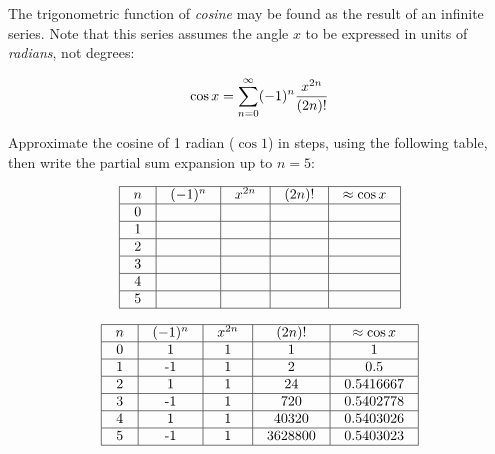 

The trigonometric function of {\it cosine} may be found as the result of an infinite series.  Note that this series assumes the angle $x$ to be expressed in units of {\it radians}, not degrees:

$$\cos x = \sum_{n=0}^{\infty} (-1)^n {x^{2n} \over {(2n)!}}$$

Approximate the cosine of 1 radian ($\cos 1$) in steps, using the following table, then write the partial sum expansion up to $n = 5$:


$$\vbox{\offinterlineskip
\halign{\strut
\vrule \quad\hfil # \ \hfil & 
\vrule \quad\hfil # \ \hfil & 
\vrule \quad\hfil # \ \hfil & 
\vrule \quad\hfil # \ \hfil & 
\vrule \quad\hfil # \ \hfil \vrule \cr
\noalign{\hrule}
%
$n$ & $(-1)^n$ & $x^{2n}$ & $(2n)!$ & $\approx \cos x$ \cr
%
\noalign{\hrule}
%
0 &  &  &  &  \cr
%
\noalign{\hrule}
%
1 &  &  &  &  \cr
%
\noalign{\hrule}
%
2 &  &  &  &  \cr
%
\noalign{\hrule}
%
3 &  &  &  &  \cr
%
\noalign{\hrule}
%
4 &  &  &  &  \cr
%
\noalign{\hrule}
%
5 &  &  &  &  \cr
%
\noalign{\hrule}
} %
}$$ %

\vskip 30pt







$$\vbox{\offinterlineskip
\halign{\strut
\vrule \quad\hfil # \ \hfil & 
\vrule \quad\hfil # \ \hfil & 
\vrule \quad\hfil # \ \hfil & 
\vrule \quad\hfil # \ \hfil & 
\vrule \quad\hfil # \ \hfil \vrule \cr
\noalign{\hrule}
%
$n$ & $(-1)^n$ & $x^{2n}$ & $(2n)!$ & $\approx \cos x$ \cr
%
\noalign{\hrule}
%
0 & 1 & 1 & 1 & 1 \cr
%
\noalign{\hrule}
%
1 & -1 & 1 & 2 & 0.5 \cr
%
\noalign{\hrule}
%
2 & 1 & 1 & 24 & 0.5416667 \cr
%
\noalign{\hrule}
%
3 & -1 & 1 & 720 & 0.5402778 \cr
%
\noalign{\hrule}
%
4 & 1 & 1 & 40320 & 0.5403026 \cr
%
\noalign{\hrule}
%
5 & -1 & 1 & 3628800 & 0.5403023 \cr
%
\noalign{\hrule}
} %
}$$ %


